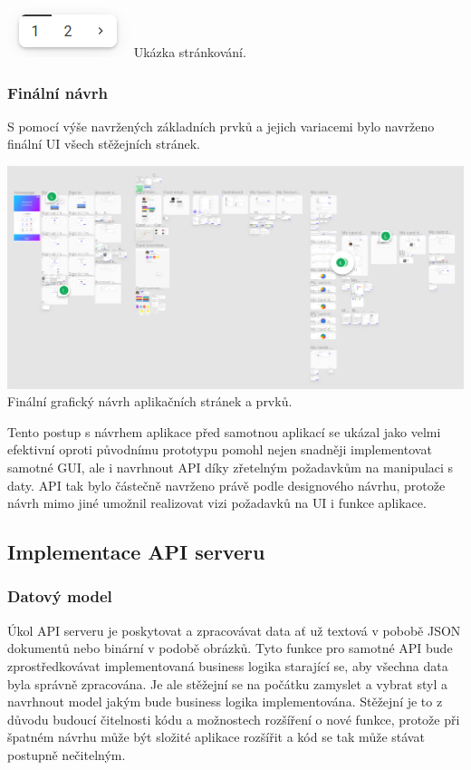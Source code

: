 \begin{itemize}
\begin{itemize}
			\includegraphics[width=0.24\linewidth]{obrazky/strankovani}\hfill
			Ukázka stránkování. %

		\subsubsection{Finální návrh}

		S pomocí výše navržených základních prvků a jejich variacemi bylo navrženo finální \ac{UI} všech stěžejních
		stránek.

		\includegraphics[width=0.24\linewidth]{obrazky/finalni_navrh}\hfill
		Finální grafický návrh aplikačních stránek a prvků. %

		Tento postup s návrhem aplikace před samotnou aplikací se ukázal jako velmi efektivní oproti původnímu prototypu
		pomohl nejen snadněji implementovat samotné \ac{GUI}, ale i navrhnout \ac{API} díky zřetelným požadavkům na
		manipulaci s daty.
		\ac{API} tak bylo částečně navrženo právě podle designového návrhu, protože návrh mimo jiné umožnil realizovat
		vizi požadavků na \ac{UI} i funkce aplikace.

	\subsection{Implementace API serveru}

		\subsubsection{Datový model}

		Úkol API serveru je poskytovat a zpracovávat data ať už textová v pobobě \ac{JSON} dokumentů nebo binární v podobě
		obrázků.
		Tyto funkce pro samotné API bude zprostředkovávat implementovaná business logika starající se, aby všechna data
		byla správně zpracována.
		Je ale stěžejní se na počátku zamyslet a vybrat styl a navrhnout model jakým bude business logika implementována.
		Stěžejní je to z důvodu budoucí čitelnosti kódu a možnostech rozšíření o nové funkce, protože při špatném
		návrhu může být složité aplikace rozšířit a kód se tak může stávat postupně nečitelným.


\end{itemize}
\end{itemize}
